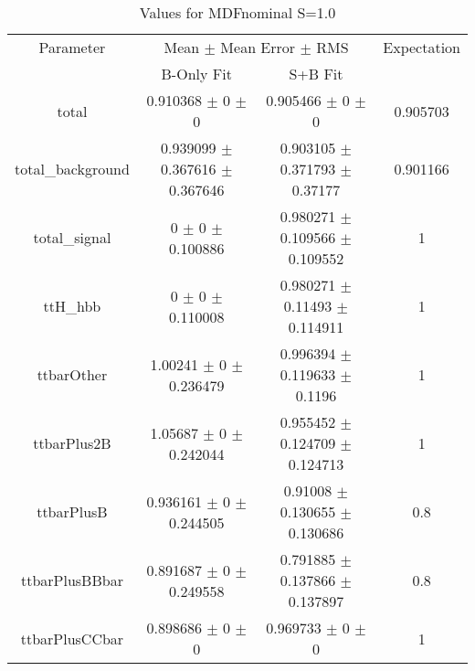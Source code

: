 \begin{table}
\centering
\caption{Values for MDFnominal S=1.0}
\begin{tabular}{cccc}
\toprule
Parameter & \multicolumn{2}{c}{Mean $\pm$ Mean Error $\pm$ RMS} & Expectation\\
 & B-Only Fit & S+B Fit & \\
\midrule
total & \num{0.910368} $\pm$ \num{0} $\pm$ \num{0} & \num{0.905466} $\pm$ \num{0} $\pm$ \num{0} & \num{0.905703}\\
total\_background & \num{0.939099} $\pm$ \num{0.367616} $\pm$ \num{0.367646} & \num{0.903105} $\pm$ \num{0.371793} $\pm$ \num{0.37177} & \num{0.901166}\\
total\_signal & \num{0} $\pm$ \num{0} $\pm$ \num{0.100886} & \num{0.980271} $\pm$ \num{0.109566} $\pm$ \num{0.109552} & \num{1}\\
ttH\_hbb & \num{0} $\pm$ \num{0} $\pm$ \num{0.110008} & \num{0.980271} $\pm$ \num{0.11493} $\pm$ \num{0.114911} & \num{1}\\
ttbarOther & \num{1.00241} $\pm$ \num{0} $\pm$ \num{0.236479} & \num{0.996394} $\pm$ \num{0.119633} $\pm$ \num{0.1196} & \num{1}\\
ttbarPlus2B & \num{1.05687} $\pm$ \num{0} $\pm$ \num{0.242044} & \num{0.955452} $\pm$ \num{0.124709} $\pm$ \num{0.124713} & \num{1}\\
ttbarPlusB & \num{0.936161} $\pm$ \num{0} $\pm$ \num{0.244505} & \num{0.91008} $\pm$ \num{0.130655} $\pm$ \num{0.130686} & \num{0.8}\\
ttbarPlusBBbar & \num{0.891687} $\pm$ \num{0} $\pm$ \num{0.249558} & \num{0.791885} $\pm$ \num{0.137866} $\pm$ \num{0.137897} & \num{0.8}\\
ttbarPlusCCbar & \num{0.898686} $\pm$ \num{0} $\pm$ \num{0} & \num{0.969733} $\pm$ \num{0} $\pm$ \num{0} & \num{1}\\
\bottomrule
\end{tabular}
\end{table}